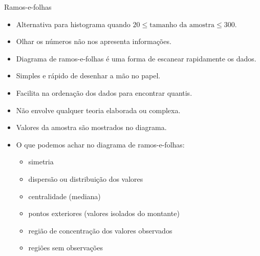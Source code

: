 \documentclass[
  10pt,
  ignorenonframetext,
]{beamer}
\providecommand{\tightlist}{%
  \setlength{\itemsep}{0pt}\setlength{\parskip}{0pt}}\usepackage{longtable,booktabs,array}
\begin{document}
\begin{frame}{Ramos-e-folhas}
\protect\hypertarget{ramos-e-folhas-1}{}
\begin{itemize}
\tightlist
\item
  Alternativa para histograma quando
  \(20 \leq \text{tamanho da amostra} \leq 300\).
\item
  Olhar os números não nos apresenta informações.
\item
  Diagrama de ramos-e-folhas é uma forma de escanear rapidamente os
  dados.
\item
  Simples e rápido de desenhar a mão no papel.
\item
  Facilita na ordenação dos dados para encontrar quantis.
\item
  Não envolve qualquer teoria elaborada ou complexa.
\item
  Valores da amostra são mostrados no diagrama.
\item
  O que podemos achar no diagrama de ramos-e-folhas:

  \begin{itemize}
  \tightlist
  \item
    simetria
  \item
    dispersão ou distribuição dos valores
  \item
    centralidade (mediana)
  \item
    pontos exteriores (valores isolados do montante)
  \item
    região de concentração dos valores observados
  \item
    regiões sem observações
  \end{itemize}
\end{itemize}
\end{frame}
\end{document}
